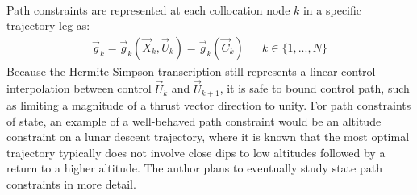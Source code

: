 \paragraph{}
Path constraints are represented at each collocation node $k$ in a specific trajectory leg as:
\begin{align}
\vec{g}_{k} = \vec{g}_k(\vec{X}_k,\vec{U}_k) = \vec{g}_{k} ( \vec{C}_k ) &&
k \in \{ 1, ... , N \}
\end{align}
Because the Hermite-Simpson transcription still represents a linear control interpolation between control $\vec{U}_k$ and $\vec{U}_{k+1}$, it is safe to bound control path, such as limiting a magnitude of a thrust vector direction to unity. For path constraints of state, an example of a well-behaved path constraint would be an altitude constraint on a lunar descent trajectory, where it is known that the most optimal trajectory typically does not involve close dips to low altitudes followed by a return to a higher altitude. The author plans to eventually study state path constraints in more detail.


